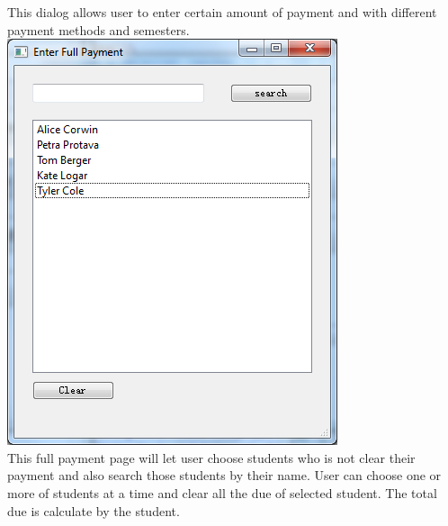 This dialog allows user to enter certain amount of payment and with different payment methods and semesters.\\
\includegraphics[scale=0.5]{pics/full_pay.png}\\
This full payment page will let user choose students who is not clear their payment and also search those students by their name. User can choose one or more of students at a time and clear all the due of selected student. The total due is calculate by the student.


